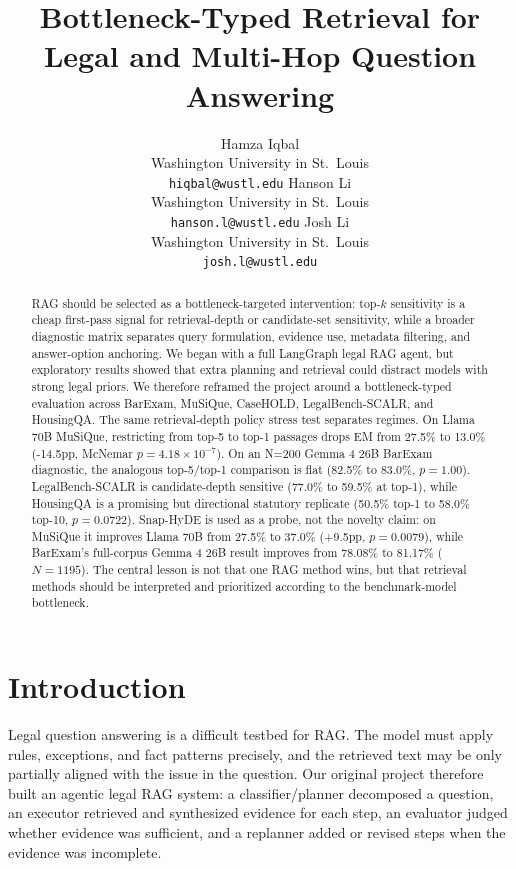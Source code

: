 \documentclass{article}
\title{Bottleneck-Typed Retrieval for Legal and Multi-Hop Question Answering}
\author{%
  Hamza Iqbal \\
  Washington University in St.\ Louis \\
  \texttt{hiqbal@wustl.edu}
  \And
  Hanson Li \\
  Washington University in St.\ Louis \\
  \texttt{hanson.l@wustl.edu}
  \And
  Josh Li \\
  Washington University in St.\ Louis \\
  \texttt{josh.l@wustl.edu}
}
\newcommand{\method}[1]{\texttt{\detokenize{#1}}}
\begin{document}
\maketitle

\begin{abstract}
RAG should be selected as a bottleneck-targeted intervention: top-$k$
sensitivity is a cheap first-pass signal for retrieval-depth or candidate-set
sensitivity, while a broader diagnostic matrix separates query formulation,
evidence use, metadata filtering, and answer-option anchoring. We began with a
full LangGraph legal RAG agent, but exploratory results showed that extra
planning and retrieval could distract models with strong legal priors. We
therefore reframed the project around a bottleneck-typed evaluation across
BarExam, MuSiQue, CaseHOLD, LegalBench-SCALR, and HousingQA. The same
retrieval-depth policy stress test separates regimes. On Llama 70B MuSiQue, restricting
\method{rag_simple} from top-5 to top-1 passages drops EM from 27.5\% to
13.0\% (-14.5pp, McNemar $p=4.18\times10^{-7}$). On an N=200 Gemma 4 26B
BarExam diagnostic, the analogous top-5/top-1 comparison is flat (82.5\% to
83.0\%, $p=1.00$). LegalBench-SCALR is candidate-depth sensitive (77.0\% to
59.5\% at top-1), while HousingQA is a promising but directional statutory
replicate (50.5\% top-1 to 58.0\% top-10, $p=0.0722$). Snap-HyDE is used as a
probe, not the novelty claim: on MuSiQue it improves Llama 70B from 27.5\% to
37.0\% (+9.5pp, $p=0.0079$), while BarExam's full-corpus Gemma 4 26B
\method{rag_snap_hyde} result improves from 78.08\% to 81.17\% ($N=1195$).
The central lesson is not that one RAG method wins, but that retrieval methods
should be interpreted and prioritized according to the benchmark-model
bottleneck.
\end{abstract}

\section{Introduction}

Legal question answering is a difficult testbed for RAG. The model must apply
rules, exceptions, and fact patterns precisely, and the retrieved text may be
only partially aligned with the issue in the question. Our original project
therefore built an agentic legal RAG system: a classifier/planner decomposed a
question, an executor retrieved and synthesized evidence for each step, an
evaluator judged whether evidence was sufficient, and a replanner added or
revised steps when the evidence was incomplete.
\end{document}
